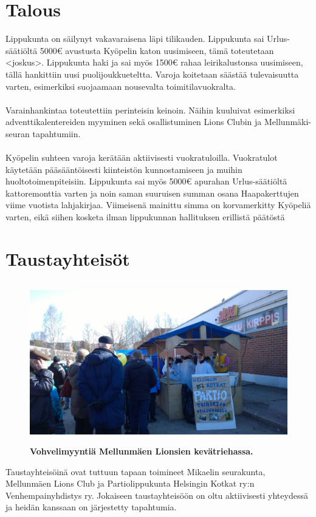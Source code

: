 \documentclass[a4paper, 12pt, finnish]{report} %
\begin{document}
\section{Talous}
Lippukunta on säilynyt vakavaraisena läpi tilikauden. Lippukunta sai Urlus-säätiöltä 5000\euro{} avustusta Kyöpelin katon uusimiseen, tämä toteutetaan <joskus>. Lippukunta haki ja sai myös 1500\euro{} rahaa leirikalustonsa uusimiseen, tällä hankittiin uusi puolijoukkueteltta. Varoja koitetaan säästää tulevaisuutta varten, esimerkiksi suojaamaan nousevalta toimitilavuokralta.\\
\\Varainhankintaa toteutettiin perinteisin keinoin. Näihin kuuluivat esimerkiksi adventtikalentereiden myyminen sekä osallistuminen Lions Clubin ja Mellunmäki-seuran tapahtumiin.\\
\\Kyöpelin suhteen varoja kerätään aktiivisesti vuokratuloilla. Vuokratulot käytetään pääsääntöisesti kiinteistön kunnostamiseen ja muihin huoltotoimenpiteisiin. Lippukunta sai myös 5000\euro{} apurahan Urlus-säätiöltä kattoremonttia varten ja noin saman suuruisen summan osana Haapakerttujen viime vuotista lahjakirjaa. Viimeisenä mainittu simma on korvamerkitty Kyöpeliä varten, eikä siihen kosketa ilman lippukunnan hallituksen erillistä päätöstä

\newpage
\section{Taustayhteisöt}
\begin{figure}[htb]
	\begin{center}
		\includegraphics[height=7cm]{lettukestit.jpg}
	\end{center}
	\captionsetup{labelformat=empty}
	\caption{\textbf{Vohvelimyyntiä Mellunmäen Lionsien kevätriehassa.}}
\end{figure}

Taustayhteisöinä ovat tuttuun tapaan toimineet Mikaelin seurakunta, Mellunmäen Lions Club ja Partiolippukunta Helsingin Kotkat ry:n Venhempainyhdistys ry. Jokaiseen taustayhteisöön on oltu aktiivisesti yhteydessä ja heidän kanssaan on järjestetty tapahtumia.
\end{document}
